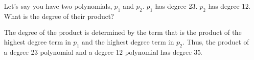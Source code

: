 \begin{Exercise}[title={Observations}, label=obsmultpoly]
  Let's say you have two polynomials, $p_1$ and $p_2$.  $p_1$ has degree
  23.  $p_2$ has degree 12.  What is the degree of their product?
\end{Exercise}
\begin{Answer}[ref=obsmultpoly]
  The degree of the product is determined by the term that is the
  product of the highest degree term in $p_1$ and the highest degree
  term in $p_2$. Thus, the product of a degree 23 polynomial and a
  degree 12 polynomial has degree 35.
\end{Answer}
  
